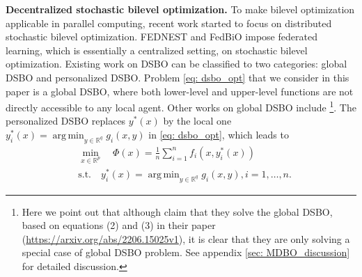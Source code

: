 \documentclass{article}
\theoremstyle{plain}
\theoremstyle{definition}
\theoremstyle{remark}
\DeclareMathOperator*{\argmin}{arg\,min}
\newcommand{\R}{\mathbb{R}}
\begin{document}
\textbf{Decentralized stochastic bilevel optimization.} To make bilevel optimization applicable in parallel computing, recent work started to focus on distributed stochastic bilevel optimization. FEDNEST \citep{tarzanagh2022fednest} and FedBiO \citep{fedbilevel} impose federated learning, which is essentially a centralized setting, on stochastic bilevel optimization. 
Existing work on DSBO can be classified to two categories: global DSBO and personalized DSBO. Problem \eqref{eq: dsbo_opt} that we consider in this paper is a global DSBO, where both lower-level and upper-level functions are not directly accessible to any local agent. Other works on global DSBO include \citet{chen2022decentralized, yang2022decentralized, gao2022stochastic}\footnote{Here we point out that although \citet{gao2022stochastic} claim that they solve the global DSBO, based on equations (2) and (3) in their paper (\url{https://arxiv.org/abs/2206.15025v1}), it is clear that they are only solving a special case of global DSBO problem. See appendix \ref{sec: MDBO_discussion} for detailed discussion.}. The personalized DSBO \citep{lu2022decentralized} replaces $y^*(x)$ by the local one $y_i^*(x) =\argmin_{y\in\R^q}g_i(x,y)$ in \eqref{eq: dsbo_opt}, which leads to
\begin{equation}\label{eq: pdsbo_opt}
    \begin{aligned}
        &\min_{x\in\R^p}\quad \Phi(x) = \frac{1}{n}\sum_{i=1}^{n}f_i(x,y_i^*(x)) \\
        &\text{s.t.}\quad y_i^*(x) = \argmin_{y\in\R^{q}}g_i(x,y), i=1,\ldots,n.
    \end{aligned}
\end{equation}
\end{document}

